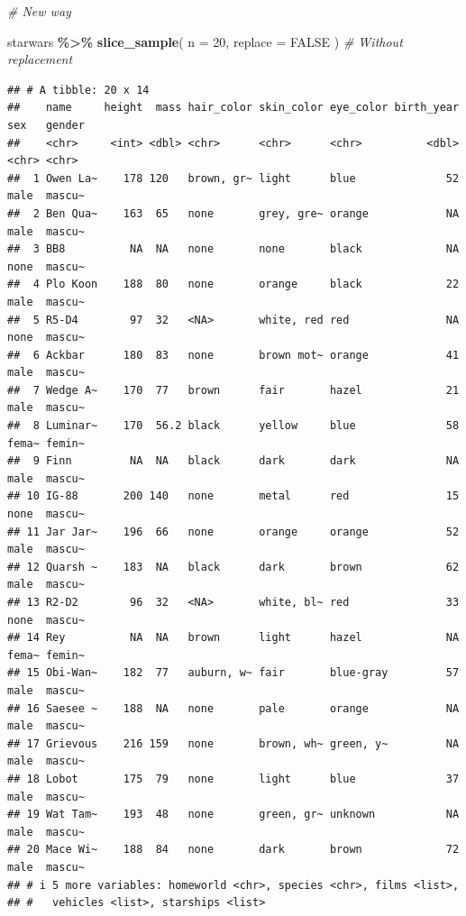 \documentclass[
]{book}
\newenvironment{Shaded}{\begin{snugshade}}{\end{snugshade}}
\newcommand{\AttributeTok}[1]{\textcolor[rgb]{0.13,0.29,0.53}{#1}}
\newcommand{\CommentTok}[1]{\textcolor[rgb]{0.56,0.35,0.01}{\textit{#1}}}
\newcommand{\ConstantTok}[1]{\textcolor[rgb]{0.56,0.35,0.01}{#1}}
\newcommand{\DecValTok}[1]{\textcolor[rgb]{0.00,0.00,0.81}{#1}}
\newcommand{\FunctionTok}[1]{\textcolor[rgb]{0.13,0.29,0.53}{\textbf{#1}}}
\newcommand{\NormalTok}[1]{#1}
\newcommand{\SpecialCharTok}[1]{\textcolor[rgb]{0.81,0.36,0.00}{\textbf{#1}}}
\begin{document}
\begin{Shaded}
\begin{Highlighting}[]
\CommentTok{\# New way}

\NormalTok{starwars }\SpecialCharTok{\%\textgreater{}\%}
  \FunctionTok{slice\_sample}\NormalTok{(}
    \AttributeTok{n =} \DecValTok{20}\NormalTok{,}
    \AttributeTok{replace =} \ConstantTok{FALSE}
\NormalTok{  ) }\CommentTok{\# Without replacement}
\end{Highlighting}
\end{Shaded}

\begin{verbatim}
## # A tibble: 20 x 14
##    name     height  mass hair_color skin_color eye_color birth_year sex   gender
##    <chr>     <int> <dbl> <chr>      <chr>      <chr>          <dbl> <chr> <chr> 
##  1 Owen La~    178 120   brown, gr~ light      blue              52 male  mascu~
##  2 Ben Qua~    163  65   none       grey, gre~ orange            NA male  mascu~
##  3 BB8          NA  NA   none       none       black             NA none  mascu~
##  4 Plo Koon    188  80   none       orange     black             22 male  mascu~
##  5 R5-D4        97  32   <NA>       white, red red               NA none  mascu~
##  6 Ackbar      180  83   none       brown mot~ orange            41 male  mascu~
##  7 Wedge A~    170  77   brown      fair       hazel             21 male  mascu~
##  8 Luminar~    170  56.2 black      yellow     blue              58 fema~ femin~
##  9 Finn         NA  NA   black      dark       dark              NA male  mascu~
## 10 IG-88       200 140   none       metal      red               15 none  mascu~
## 11 Jar Jar~    196  66   none       orange     orange            52 male  mascu~
## 12 Quarsh ~    183  NA   black      dark       brown             62 male  mascu~
## 13 R2-D2        96  32   <NA>       white, bl~ red               33 none  mascu~
## 14 Rey          NA  NA   brown      light      hazel             NA fema~ femin~
## 15 Obi-Wan~    182  77   auburn, w~ fair       blue-gray         57 male  mascu~
## 16 Saesee ~    188  NA   none       pale       orange            NA male  mascu~
## 17 Grievous    216 159   none       brown, wh~ green, y~         NA male  mascu~
## 18 Lobot       175  79   none       light      blue              37 male  mascu~
## 19 Wat Tam~    193  48   none       green, gr~ unknown           NA male  mascu~
## 20 Mace Wi~    188  84   none       dark       brown             72 male  mascu~
## # i 5 more variables: homeworld <chr>, species <chr>, films <list>,
## #   vehicles <list>, starships <list>
\end{verbatim}
\end{document}
